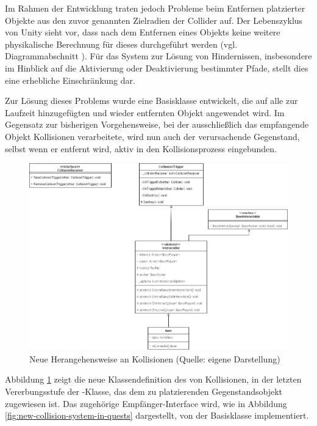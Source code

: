 Im Rahmen der Entwicklung traten jedoch Probleme beim Entfernen platzierter Objekte aus den zuvor genannten Zielradien der Collider auf. Der Lebenszyklus von Unity sieht vor, dass nach dem Entfernen eines Objekts keine weitere physikalische Berechnung für dieses durchgeführt werden (vgl. Diagrammabschnitt ). Für das System zur Lösung von Hindernissen, insbesondere im Hinblick auf die Aktivierung oder Deaktivierung bestimmter Pfade, stellt dies eine erhebliche Einschränkung dar.

Zur Lösung dieses Problems wurde eine Basisklasse entwickelt, die auf alle zur Laufzeit hinzugefügten und wieder entfernten Objekt angewendet wird. Im Gegensatz zur bisherigen Vorgehensweise, bei der ausschließlich das empfangende Objekt Kollisionen verarbeitete, wird nun auch der verursachende Gegenstand, selbst wenn er entfernt wird, aktiv in den Kollisionsprozess eingebunden.

\begin{figure}[ht]
\centering
\includegraphics[width=1\linewidth]{content/pictures/CollisionSystem.drawio.png}
\caption{Neue Herangehensweise an Kollisionen (Quelle: eigene Darstellung)}
\label{fig:new-collision-system}
\end{figure}

Abbildung \ref{fig:new-collision-system} zeigt die neue Klassendefinition des  von Kollisionen, in der letzten Vererbungsstufe der -Klasse, das dem zu platzierenden Gegenstandsobjekt zugewiesen ist. Das zugehörige Empfänger-Interface wird, wie in Abbildung \ref{fig:new-collision-system-in-quests} dargestellt, von der Basisklasse  implementiert.

